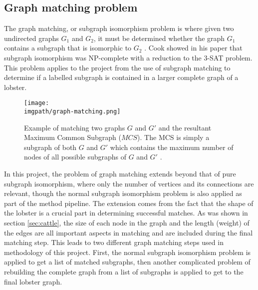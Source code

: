 \subsection{Graph matching problem}
The graph matching, or subgraph isomorphism problem is where given two undirected graphs $G_1$ and $G_2$, it must be determined whether the graph $G_1$ contains a subgraph that is isomorphic to $G_2$ \cite{subgraph}. Cook showed in his paper that subgraph isomorphism was NP-complete with a reduction to the 3-SAT problem. This problem applies to the project from the use of subgraph matching to determine if a labelled subgraph is contained in a larger complete graph of a lobster. 
\begin{figure}[H]
\centering
\texttt{[image: \\imgpath/graph-matching.png]}
\caption{Example of matching two graphs $G$ and $G'$ and the resultant Maximum Common Subgraph ($MCS$). The MCS is simply a subgraph of both $G$ and $G'$ which contains the maximum number of nodes of all possible subgraphs of $G$ and $G'$ \cite{graph-matching}.}
\end{figure}
\noindent
In this project, the problem of graph matching extends beyond that of pure subgraph isomorphism, where only the number of vertices and its connections are relevant, though the normal subgraph isomorphism problem is also applied as part of the method pipeline. The extension comes from the fact that the shape of the lobster is a crucial part in determining successful matches. As was shown in section \ref{sec:cattle}, the size of each node in the graph and the length (weight) of the edges are all important aspects in matching and are included during the final matching step. This leads to two different graph matching steps used in methodology of this project. First, the normal subgraph isomorphism problem is applied to get a list of matched subgraphs, then another complicated problem of rebuilding the complete graph from a list of subgraphs is applied to get to the final lobster graph.

